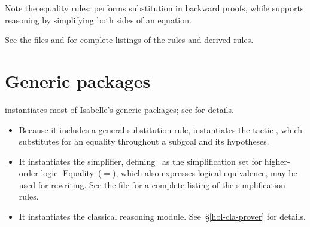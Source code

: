 Note the equality rules:  performs substitution in
backward proofs, while  supports reasoning by
simplifying both sides of an equation.

See the files  and
 for complete listings of the rules and
derived rules.


\section{Generic packages}
{\HOL} instantiates most of Isabelle's generic packages;
see  for details.
\begin{itemize}
\item 
Because it includes a general substitution rule, {\HOL} instantiates the
tactic , which substitutes for an equality
throughout a subgoal and its hypotheses.
\item 
It instantiates the simplifier, defining~ as the
simplification set for higher-order logic.  Equality~($=$), which also
expresses logical equivalence, may be used for rewriting.  See the file
 for a complete listing of the simplification
rules. 
\item 
It instantiates the classical reasoning module.  See~\S\ref{hol-cla-prover}
for details. 
\end{itemize}


